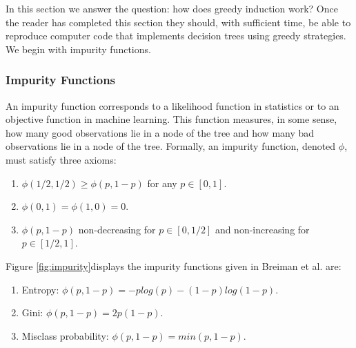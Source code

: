 In this section we answer the question: how does greedy induction work? Once the reader has completed this section they should, with sufficient time, be able to reproduce computer code that implements decision trees using greedy strategies. We begin with impurity functions. 

\subsubsection{Impurity Functions}

An impurity function corresponds to a likelihood function in statistics or to an objective function in machine learning. This function measures, in some sense, how many good observations lie in a node of the tree and how many bad observations lie in a node of the tree. Formally, an impurity function, denoted $\phi$, must satisfy three axioms:

\begin{enumerate}
\item $\phi(1/2,1/2) \geq \phi(p, 1-p)$ for any $p\in[0,1]$. 
\item $\phi(0,1)=\phi(1,0)=0$. 
\item $ \phi(p, 1-p)$ non-decreasing for $p\in[0,1/2]$ and non-increasing for $p\in[1/2,1]$. 
\end{enumerate}

Figure \ref{fig:impurity}displays  the impurity functions given in Breiman et al. \cite{breiman1984classification} are: 
\begin{enumerate}
\item Entropy: $\phi(p,1-p)= -plog(p) -(1-p)log(1-p)$.
\item Gini: $\phi(p, 1-p)=2p(1-p)$.
\item Misclass probability: $\phi(p, 1-p)=min(p,1-p).$
\end{enumerate}

